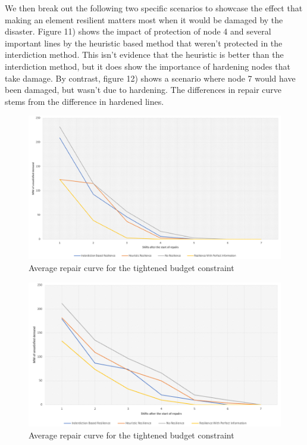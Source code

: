 \documentclass{article}
\begin{document}
	We then break out the following two specific scenarios to showcase the effect that making an element resilient matters most when it would be damaged by the disaster. Figure 11) shows the impact of protection of node 4 and several important lines by the heuristic based method that weren't protected in the interdiction method. This isn't evidence that the heuristic is better than the interdiction method, but it does show the importance of hardening nodes that take damage. By contrast, figure 12) shows a scenario where node 7 would have been damaged, but wasn't due to hardening. The differences in repair curve stems from the difference in hardened lines. 
	
	\begin{figure}[htbp]
		\centering
		\includegraphics[width=.9\linewidth]{Heuristic24Scenario.png}
		\caption{Average repair curve for the tightened budget constraint}
	\end{figure}
	\begin{figure}[htbp]
		\centering
		\includegraphics[width=.9\linewidth]{Inderdiction24Scenario.png}
		\caption{Average repair curve for the tightened budget constraint}
	\end{figure}
	
\end{document}
